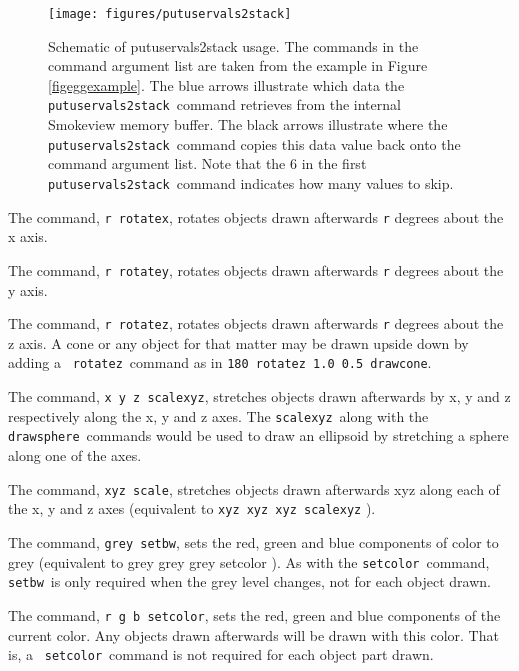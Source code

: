 \documentclass[11pt,twoside]{book}
\newcommand{\figoptions}{hbp}
\newcommand{\hitem}[1]{\item[{\bf #1} \hfill]}
\begin{document}
\begin{figure}[\figoptions]
\begin{center}
\texttt{[image: figures/putuservals2stack]}\\
\end{center}
\caption[Schematic of putuservals2stack usage.]{Schematic of putuservals2stack usage. The commands in the command argument list are taken from the example in Figure \ref{figeggexample}.
The blue arrows illustrate which data the {\tt putuservals2stack}\ command retrieves from the internal Smokeview memory buffer.  The black arrows illustrate where the {\tt putuservals2stack}\ command copies this data value back onto the command argument list. Note that the 6 in the first {\tt putuservals2stack}\ command indicates how many values to skip.
}
 \label{figputuservals2stack}
\end{figure}

\hitem{ROTATEX} The command, {\tt r rotatex}, rotates objects
drawn afterwards {\tt r} degrees about the x axis.

\hitem{ROTATEY} The command, {\tt r rotatey}, rotates objects
drawn afterwards {\tt r} degrees about the y axis.

\hitem{ROTATEZ} The command, {\tt r rotatez}, rotates objects
drawn afterwards {\tt r} degrees about the z axis.  A cone or any
object for that matter may be drawn upside down by adding a {\tt
rotatez}\ command as in {\tt 180 rotatez 1.0 0.5 drawcone}.

\hitem{SCALEXYZ} The command, {\tt x y z scalexyz}, stretches
objects drawn afterwards by x, y and z respectively along the x, y
and z axes. The {\tt scalexyz}\ along with the {\tt drawsphere}\
commands would be used to draw an ellipsoid by stretching a sphere
along one of the axes.

\hitem{SCALE} The command, {\tt xyz scale}, stretches objects
drawn afterwards xyz along each of the x, y and z axes (equivalent
to {\tt xyz xyz xyz scalexyz} ).

\hitem{SETBW} The command, {\tt grey setbw}, sets the red, green
and blue components of color to grey (equivalent to grey grey grey
setcolor ).  As with the {\tt setcolor}\ command, {\tt setbw}\ is
only required when the grey level changes, not for each object
drawn.

\hitem{SETCOLOR} The command, {\tt r g b setcolor}, sets the red,
green and blue components of the current color.  Any objects
drawn afterwards will be drawn with this color.  That is, a {\tt
setcolor}\ command is not required for each object part drawn.
\end{document}

